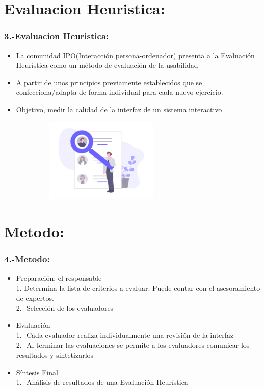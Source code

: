 \documentclass[11pt]{beamer}
\begin{document}
\section{Evaluacion Heuristica:}
\begin{frame}
\frametitle{3.-Evaluacion Heuristica:}

\begin{itemize}
\item La comunidad IPO(Interacción persona-ordenador) presenta a la Evaluación Heurística como un método de evaluación de la usabilidad
\item A partir de unos principios previamente establecidos que se confecciona/adapta de forma individual para cada nuevo ejercicio.
\item Objetivo, medir la calidad de la interfaz de un sistema interactivo
\end{itemize}

\begin{figure}
  \centering
  \includegraphics[width=8.0cm,height=4.0cm]{img/image_3.png}
\end{figure}
\end{frame}

\section{Metodo:}
\begin{frame}
\frametitle{4.-Metodo:}

\begin{itemize}
 \item Preparación: el responsable\\ 1.-Determina la lista de criterios a evaluar. Puede contar con el asesoramiento de expertos.\\ 2.- Selección de los evaluadores
 \item Evaluación\\ 1.- Cada evaluador realiza individualmente una revisión de la interfaz\\ 2.- Al terminar las evaluaciones se permite a los evaluadores comunicar los resultados y sintetizarlos
  \item Síntesis Final\\ 1.- Análisis de resultados de una Evaluación Heurística
\end{itemize}

\end{frame}
\end{document}
